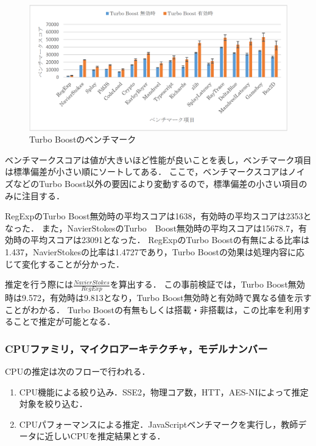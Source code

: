\begin{figure}[H]
	\centering
    \includegraphics[width=\textwidth,pagebox=artbox]{fig/turbo_boost.png}
    \caption{Turbo Boostのベンチマーク}
    \label{fig-turbo_boost}
\end{figure}

ベンチマークスコアは値が大きいほど性能が良いことを表し，ベンチマーク項目は標準偏差が小さい順にソートしてある．
ここで，ベンチマークスコアはノイズなどのTurbo Boost以外の要因により変動するので，標準偏差の小さい項目のみに注目する．

RegExpのTurbo Boost無効時の平均スコアは1638，有効時の平均スコアは2353となった．
また，NavierStokesのTurbo　Boost無効時の平均スコアは15678.7，有効時の平均スコアは23091となった．
RegExpのTurbo Boostの有無による比率は1.437，NavierStokesの比率は1.4727であり，Turbo Boostの効果は処理内容に応じて変化することが分かった．

推定を行う際には$\frac{NavierStokes}{RegExp}$を算出する．
この事前検証では，Turbo Boost無効時は9.572，有効時は9.813となり，Turbo Boost無効時と有効時で異なる値を示すことがわかる．
Turbo Boostの有無もしくは搭載・非搭載は，この比率を利用することで推定が可能となる．

\subsubsection{CPUファミリ，マイクロアーキテクチャ，モデルナンバー}
CPUの推定は次のフローで行われる．

\begin{enumerate}
\item CPU機能による絞り込み．SSE2，物理コア数，HTT，AES-NIによって推定対象を絞り込む．
\item CPUパフォーマンスによる推定．JavaScriptベンチマークを実行し，教師データに近しいCPUを推定結果とする．
\end{enumerate}

